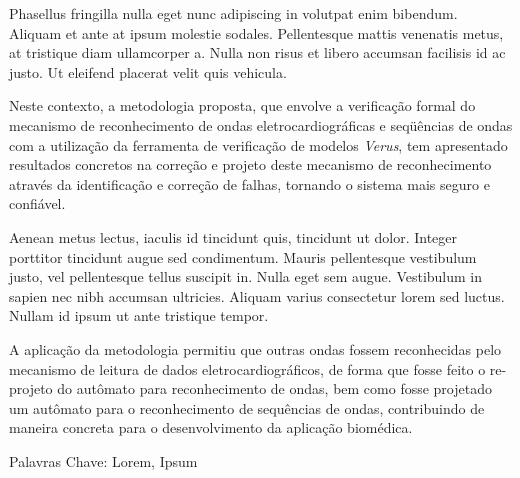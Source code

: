 
Phasellus fringilla nulla eget nunc adipiscing in volutpat enim bibendum. 
Aliquam et ante at ipsum molestie sodales. Pellentesque mattis venenatis metus, 
at tristique diam ullamcorper a. Nulla non risus et libero accumsan facilisis 
id ac justo. Ut eleifend placerat velit quis vehicula. 

Neste contexto, a metodologia proposta, que envolve a verificação formal
do mecanismo de reconhecimento de ondas eletrocardiogr\'aficas e
seqüências de ondas com a utilização da ferramenta de verificação
de modelos {\em Verus}, tem apresentado resultados concretos na
correção e projeto deste mecanismo de reconhecimento atrav\'es da
identificação e correção de falhas, tornando o sistema mais seguro e
confi\'avel.

Aenean metus lectus, iaculis id tincidunt quis, 
tincidunt ut dolor. Integer porttitor tincidunt augue sed condimentum. Mauris pellentesque 
vestibulum justo, vel pellentesque tellus suscipit in. Nulla eget sem augue. 
Vestibulum in sapien nec nibh accumsan ultricies. Aliquam varius consectetur lorem sed luctus. 
Nullam id ipsum ut ante tristique tempor.

A aplica\c{c}\~ao da metodologia permitiu que outras ondas fossem
reconhecidas pelo mecanismo de leitura de dados
eletrocardiogr\'aficos, de forma que fosse feito o
re-projeto do autômato para reconhecimento de ondas, bem como
fosse projetado um aut\^omato para o reconhecimento de sequ\^encias
de ondas, contribuindo de maneira concreta para o desenvolvimento
da aplicação biom\'edica.


Palavras Chave: Lorem, Ipsum
